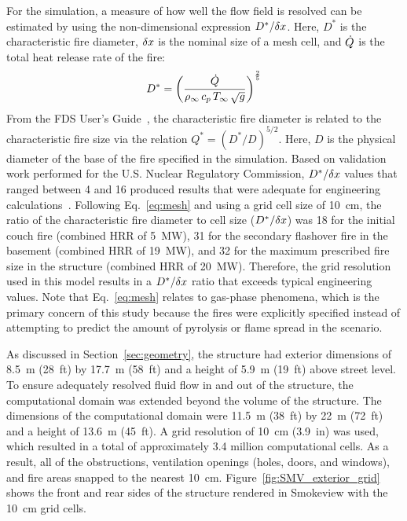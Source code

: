 \documentclass[12pt,oneside]{book}
\begin{document}
For the simulation, a measure of how well the flow field is resolved can be estimated by using the non-dimensional expression $D^*/\delta x$. Here, $D^*$ is the characteristic fire diameter, $\delta x$ is the nominal size of a mesh cell, and $\dot{Q}$ is the total heat release rate of the fire:
\begin{equation}
D^* = \left(
     \frac{\dot{Q}}{\rho_\infty \, c_p \, T_\infty \, \sqrt{g}}
     \right)^\frac{2}{5}
\label{eq:mesh}
\end{equation}
From the FDS User's Guide~\cite{FDS_Users_Guide}, the characteristic fire diameter is related to the characteristic fire size via the relation $Q^* = (D^*/D)^{5/2}$. Here, $D$ is the physical diameter of the base of the fire specified in the simulation. Based on validation work performed for the U.S. Nuclear Regulatory Commission, $D^*/\delta x$ values that ranged between 4 and 16 produced results that were adequate for engineering calculations~\cite{NUREG_1824}. Following Eq.~\ref{eq:mesh} and using a grid cell size of 10~cm, the ratio of the characteristic fire diameter to cell size ($D^*/\delta x$) was 18 for the initial couch fire (combined HRR of 5~MW), 31 for the secondary flashover fire in the basement (combined HRR of 19~MW), and 32 for the maximum prescribed fire size in the structure (combined HRR of 20~MW). Therefore, the grid resolution used in this model results in a $D^*/\delta x$ ratio that exceeds typical engineering values. Note that Eq.~\ref{eq:mesh} relates to gas-phase phenomena, which is the primary concern of this study because the fires were explicitly specified instead of attempting to predict the amount of pyrolysis or flame spread in the scenario.

As discussed in Section~\ref{sec:geometry}, the structure had exterior dimensions of 8.5~m (28~ft) by 17.7~m (58~ft) and a height of 5.9~m (19~ft) above street level. To ensure adequately resolved fluid flow in and out of the structure, the computational domain was extended beyond the volume of the structure. The dimensions of the computational domain were 11.5~m (38~ft) by 22~m (72~ft) and a height of 13.6~m (45~ft). A grid resolution of 10~cm (3.9~in) was used, which resulted in a total of approximately 3.4 million computational cells. As a result, all of the obstructions, ventilation openings (holes, doors, and windows), and fire areas snapped to the nearest 10~cm. Figure~\ref{fig:SMV_exterior_grid} shows the front and rear sides of the structure rendered in Smokeview with the 10~cm grid cells.
\end{document}
